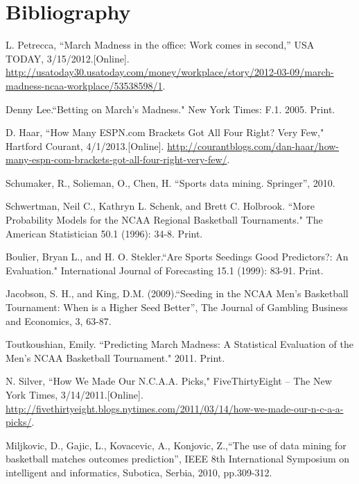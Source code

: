 \documentclass[]{article}
\begin{document}
\clearpage
\newpage
 
\section{Bibliography}     
\begin{thebibliography}{8}
	 L. Petrecca, ``March Madness in the office: Work comes in second,'' USA TODAY, 3/15/2012.[Online]. \url{http://usatoday30.usatoday.com/money/workplace/story/2012-03-09/march-madness-ncaa-workplace/53538598/1}.

	Denny Lee.``Betting on March's Madness." New York Times: F.1. 2005. Print.

	 D. Haar, ``How Many ESPN.com Brackets Got All Four Right? Very Few," Hartford Courant,
	4/1/2013.[Online]. \url{http://courantblogs.com/dan-haar/how-many-espn-com-brackets-got-all-four-right-very-few/}.

	 Schumaker, R., Solieman, O., Chen, H. ``Sports data mining. Springer'', 2010.

	 Schwertman, Neil C., Kathryn L. Schenk, and Brett C. Holbrook. ``More Probability Models for the NCAA Regional Basketball Tournaments." The American Statistician 50.1 (1996): 34-8. Print.

	 Boulier, Bryan L., and H. O. Stekler.``Are Sports Seedings Good Predictors?: An Evaluation." International Journal of Forecasting 15.1 (1999): 83-91. Print.

	 Jacobson, S. H., and King, D.M. (2009).``Seeding in the NCAA Men’s Basketball Tournament: When is a Higher Seed Better'', The Journal of Gambling Business and Economics, 3, 63-87.

	 Toutkoushian, Emily. ``Predicting March Madness: A Statistical Evaluation of the Men's NCAA Basketball Tournament." 2011. Print.

	 N. Silver, ``How We Made Our N.C.A.A. Picks," FiveThirtyEight -- The New York Times, 3/14/2011.[Online]. \url{http://fivethirtyeight.blogs.nytimes.com/2011/03/14/how-we-made-our-n-c-a-a-picks/}.

	 Miljkovic, D., Gajic, L., Kovacevic, A., Konjovic, Z.,``The use of data mining for basketball matches outcomes prediction'', IEEE 8th International Symposium on intelligent and informatics, Subotica, Serbia, 2010, pp.309-312.


\end{thebibliography}
\end{document}
